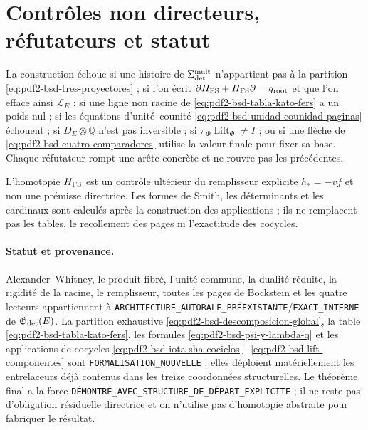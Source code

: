 \section{Contrôles non directeurs, réfutateurs et statut}

\begin{falsifier}
La construction échoue si une histoire de
$\Sigma_{\rm det}^{\rm mult}$ n'appartient pas à la partition
\eqref{eq:pdf2-bsd-tres-proyectores} ; si l'on écrit
$\partial H_{\rm FS}+H_{\rm FS}\partial=q_{\rm root}$ et que l'on efface ainsi
$\mathcal L_E$ ; si une ligne non racine de
\eqref{eq:pdf2-bsd-tabla-kato-fers} a un poids nul ; si les équations
d'unité--counité \eqref{eq:pdf2-bsd-unidad-counidad-paginas} échouent ; si
$D_E\otimes\mathbb Q$ n'est pas inversible ; si
$\pi_\Phi\operatorname{Lift}_\Phi\ne I$ ; ou si une flèche de
\eqref{eq:pdf2-bsd-cuatro-comparadores} utilise la valeur finale pour fixer sa
base. Chaque réfutateur rompt une arête concrète et ne rouvre pas les précédentes.
\end{falsifier}

L'homotopie $H_{\rm FS}$ est un contrôle ultérieur du remplisseur explicite
$h_*=-vf$ et non une prémisse directrice. Les formes de Smith, les
déterminants et les cardinaux sont calculés après la construction des applications ;
ils ne remplacent pas les tables, le recollement des pages ni l'exactitude des cocycles.

\paragraph{Statut et provenance.}
Alexander--Whitney, le produit fibré, l'unité commune, la dualité
réduite, la rigidité de la racine, le remplisseur, toutes les pages de Bockstein et
les quatre lecteurs appartiennent à
\texttt{ARCHITECTURE\_AUTORALE\_PRÉEXISTANTE}/\texttt{EXACT\_INTERNE} de
$\mathfrak G_{\rm det}(E)$. La partition exhaustive
\eqref{eq:pdf2-bsd-descomposicion-global}, la table
\eqref{eq:pdf2-bsd-tabla-kato-fers}, les formules
\eqref{eq:pdf2-bsd-psi-y-lambda-q} et les applications de cocycles
\eqref{eq:pdf2-bsd-iota-sha-cociclos}--
\eqref{eq:pdf2-bsd-lift-componentes} sont
\texttt{FORMALISATION\_NOUVELLE} : elles déploient matériellement les entrelaceurs
déjà contenus dans les treize coordonnées structurelles. Le théorème final a la
force
\texttt{DÉMONTRÉ\_AVEC\_STRUCTURE\_DE\_DÉPART\_EXPLICITE} ; il ne reste pas
d'obligation résiduelle directrice et on n'utilise pas d'homotopie abstraite pour
fabriquer le résultat.
